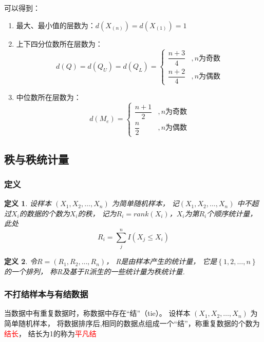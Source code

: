 \documentclass[UTF8]{ctexart}
\numberwithin{equation}{section}
\newtheorem{definition}{定义}[section]
\begin{document}
可以得到：
\begin{enumerate}
    \item 最大、最小值的层数为：$d(X_{(n)}) = d(X_{(1)})=1$

    \item 上下四分位数所在层数为：
    \begin{equation}
        d(Q) = d(Q_U) = d(Q_L) = 
        \begin{cases}
            \dfrac{n+3}{4} & ,n \mbox{为奇数} \\[1em]
            \dfrac{n+2}{4} & ,n \mbox{为偶数}
        \end{cases}
    \end{equation}
    
    \item 中位数所在层数为：
    \begin{equation}
        d(M_e) = 
        \begin{cases}
            \dfrac{n+1}{2} & ,n \mbox{为奇数} \\[1em]
            \dfrac{n}{2} & ,n \mbox{为偶数}
        \end{cases}
    \end{equation}
\end{enumerate}

\subsection{秩与秩统计量}
\subsubsection{定义}
\begin{definition}
    设样本 $(X_1, X_2,\dots, X_n)$ 为简单随机样本， 
    记$(X_1, X_2,\dots, X_n)$ 中不超过$X_i$的数据的个数为$X_i$的秩，
    记为$R_i = rank(X_i)$，$X_i$为第$R_i$个顺序统计量，
    此处
    \begin{equation}
        R_i = \sum_{j}^{n} I(X_j \leq X_i)
    \end{equation}
\end{definition}

\begin{definition}
    令$R = (R_1, R_2, \dots, R_n)$，
    R是由样本产生的统计量，
    它是$\left\{ 1,2,\dots,n \right\}$的一个排列，
    称R及基于R派生的一些统计量为秩统计量.
\end{definition}

\subsubsection{不打结样本与有结数据}
当数据中有重复数据时，称数据中存在“结”（tie）。
设样本 $(X_1, X_2,\dots, X_n)$ 为简单随机样本， 
将数据排序后,相同的数据点组成一个“结”，称重复数据的个数为
\textcolor{red}{结长}，
结长为1的称为\textcolor{red}{平凡结}
\end{document}
